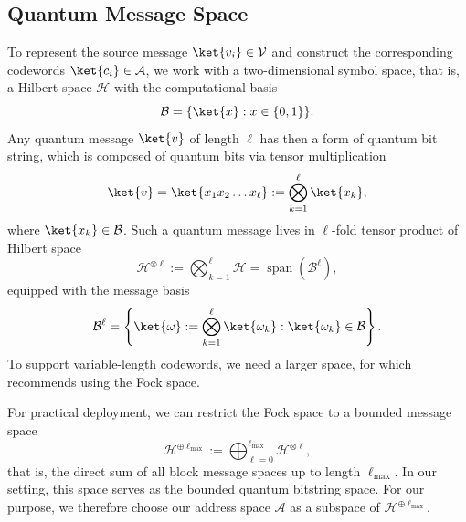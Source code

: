 \documentclass[conference]{IEEEtran}
\begin{document}
\subsection{Quantum Message Space}
To represent the source message $\ket{v_i}\in \mathcal{V}$ and construct the corresponding codewords $\ket{c_i}\in \mathcal{A}$, we work with a two-dimensional symbol space, that is, a Hilbert space $\mathcal{H}$ with the computational basis
\begin{equation}
    \mathcal{B} = \{\ket{x}: x \in\{0,1\}\}. \label{comp-basis}
\end{equation}
Any quantum message $\ket{v}$ of length $\ell$ has then a form of quantum bit string, which is composed of quantum bits via tensor multiplication
\begin{equation}
    \ket{v}=\ket{x_1 x_2 \dots x_\ell}:=\bigotimes_{k=1}^\ell\ket{x_k}, 
\end{equation}
where $\ket{x_k} \in \mathcal{B}$.
Such a quantum message lives in $\ell$-fold tensor product of Hilbert space
\begin{equation}
    \mathcal{H}^{\otimes \ell} := \bigotimes_{k=1}^\ell \mathcal{H} = \operatorname{span}(\mathcal{B}^\ell),
\end{equation}
equipped with the message basis
\begin{equation}
    \mathcal{B}^\ell = \left\{ \ket{\omega} := \bigotimes_{k=1}^\ell \ket{\omega_k} : \ket{\omega_k} \in \mathcal{B} \right\}.
\end{equation}
To support variable-length codewords, we need a larger space, for which \cite{PhysRevA.65.032313} recommends using the Fock space.

For practical deployment, we can restrict the Fock space to a bounded message space
\begin{equation}
    \mathcal{H}^{\oplus \ell_\mathrm{max}}:=\bigoplus_{\ell=0}^{\ell_\mathrm{max}} \mathcal{H}^{\otimes \ell},
\end{equation}
that is, the direct sum of all block message spaces up to length $\ell_\mathrm{max}$. In our setting, this space serves as the bounded quantum bitstring space. For our purpose, we therefore choose our address space $\mathcal{A}$ as a subspace of $\mathcal{H}^{\oplus \ell_\mathrm{max}}$. 
\end{document}
